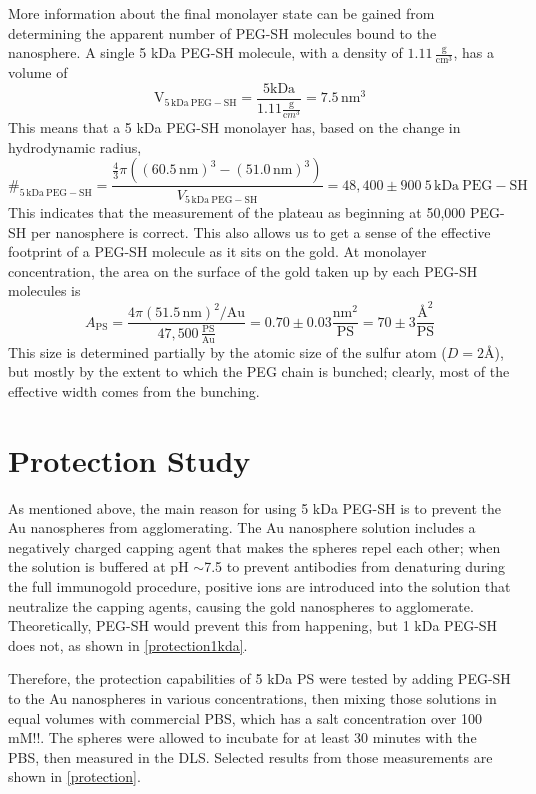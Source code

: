 More information about the final monolayer state can be gained from determining the apparent number of PEG-SH molecules bound to the nanosphere. A single 5 kDa PEG-SH molecule, with a density of $1.11\,\mathrm{\frac{g}{cm^3}}$, has a volume of
\[\mathrm{V_{5\,kDa\ PEG-SH}}
=\frac{5\mathrm{kDa}}{1.11\frac{\mathrm g}{\mathrm cm^3}}=7.5\mathrm{\,nm^3}\]
This means that a 5 kDa PEG-SH monolayer has, based on the change in hydrodynamic radius,
\[\#_{\mathrm{5\,kDa\ PEG-SH}}=
\frac{\frac{4}{3}\pi((60.5\mathrm{\,nm})^3-(51.0\mathrm{\,nm})^3)} {V_{\mathrm{5\,kDa\ PEG-SH}}}=48,400\pm900\mathrm{\ 5\,kDa\ PEG-SH}\]
This indicates that the measurement of the plateau as beginning at 50,000 PEG-SH per nanosphere is correct. This also allows us to get a sense of the effective footprint of a PEG-SH molecule as it sits on the gold. At monolayer concentration, the area on the surface of the gold taken up by each PEG-SH molecules is
\[A_{\mathrm{PS}}=\frac{4\pi(51.5\mathrm{\,nm})^2/\mathrm{Au}} {47,500\,\mathrm{\frac{PS}{Au}}}=0.70\pm0.03\frac{\mathrm{nm}^2}{\mathrm{PS}}=70\pm3\frac{\text{\AA}^2}{\mathrm{PS}}\]
This size is determined partially by the atomic size of the sulfur atom ($D=2\text{\AA}$), but mostly by the extent to which the PEG chain is bunched; clearly, most of the effective width comes from the bunching.

\section{Protection Study}
\label{protectionstudy}

As mentioned above, the main reason for using 5 kDa PEG-SH is to prevent the Au nanospheres from agglomerating. The Au nanosphere solution includes a negatively charged capping agent that makes the spheres repel each other; when the solution is buffered at pH \ensuremath{\sim}7.5 to prevent antibodies from denaturing during the full immunogold procedure, positive ions are introduced into the solution that neutralize the capping agents, causing the gold nanospheres to agglomerate. Theoretically, PEG-SH would prevent this from happening, but 1 kDa PEG-SH does not, as shown in \autoref{protection1kda}.

Therefore, the protection capabilities of 5 kDa PS were tested by adding PEG-SH to the Au nanospheres in various concentrations, then mixing those solutions in equal volumes with commercial PBS, which has a salt concentration over 100 mM!!. The spheres were allowed to incubate for at least 30 minutes with the PBS, then measured in the DLS. Selected results from those measurements are shown in \autoref{protection}.

